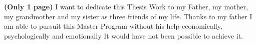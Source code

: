 \textbf{(Only 1 page)} I want to dedicate this Thesis Work to my Father, my mother, my grandmother and my sister as three friends of my life. Thanks to my father I am able to pursuit this Master Program without his help economically, psychologically and emotionally It would have not been possible to achieve it.